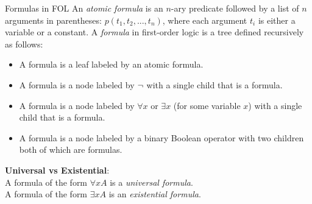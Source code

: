\documentclass[style=sailor,size=12pt,mode=present]{powerdot}
\theoremstyle{definition}
\newenvironment{defn}[1]
  {\renewcommand\theinnerdefn{#1}\innerdefn}
  {\endinnerdefn}
\begin{document}
\begin{wideslide}[bm=,toc=]{Formulas in FOL}
\begin{defn}{7.8}[Ben Ari]
An \emph{atomic formula} is an $n$-ary predicate followed by a list of $n$
arguments in parentheses: $p(t_1,t_2,...,t_n)$, where each argument $t_i$ is
either a variable or a constant. A \emph{formula} in first-order logic is
a tree defined recursively as follows:
\end{defn}
\vspace{-3ex}
\begin{itemize}
\item A formula is a leaf labeled by an atomic formula.
\item A formula is a node labeled by $\mathop{\neg}$ with a single child that is a
formula.
\item A formula is a node labeled by $\forall x$ or $\exists x$ (for some
 variable $x$) with a single child that is a formula.
\item A formula is a node labeled by a binary Boolean operator with two
children both of which are formulas.
\end{itemize}
{\bf Universal vs Existential}:\\
A formula of the form $\forall x A$ is a \emph{universal formula}.\\
A formula of the form $\exists x A$ is an \emph{existential formula}.\\
\end{wideslide}
\end{document}
